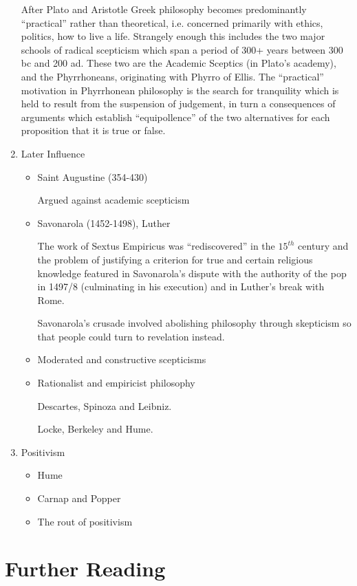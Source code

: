 \documentclass[14pt,titlepage]{extarticle}
\begin{document}
\begin{enumerate}
  After Plato and Aristotle Greek philosophy becomes predominantly ``practical'' rather than theoretical, i.e. concerned primarily with ethics, politics, how to live a life.
  Strangely enough this includes the two major schools of radical scepticism which span a period of 300+ years between 300 bc and 200 ad.
  These two are the Academic Sceptics (in Plato's academy), and the Phyrrhoneans, originating with Phyrro of Ellis.
  The ``practical'' motivation in Phyrrhonean philosophy is the search for tranquility which is held to result from the suspension of judgement, in turn a consequences of arguments which establish ``equipollence'' of the two alternatives for each proposition that it is true or false.
  
\item Later Influence
  \begin{itemize}
  \item Saint Augustine (354-430)

    Argued against academic scepticism
  \item Savonarola (1452-1498), Luther

    The work of Sextus Empiricus was ``rediscovered'' in the $15^{th}$ century and the problem of justifying a criterion for true and certain religious knowledge featured in Savonarola's dispute with the authority of the pop in 1497/8 (culminating in his execution) and in Luther's break with Rome.

    Savonarola's crusade involved abolishing philosophy through skepticism so that people could turn to revelation instead. 
    
  \item Moderated and constructive scepticisms
  \item Rationalist and empiricist philosophy
    
    Descartes, Spinoza and Leibniz.

    Locke, Berkeley and Hume.
  \end{itemize}
\item Positivism \cite{kolakowski66}
  \begin{itemize}
  \item Hume
  \item Carnap and Popper
  \item The rout of positivism
  \end{itemize}
\end{enumerate}

\section{Further Reading}
\end{document}
